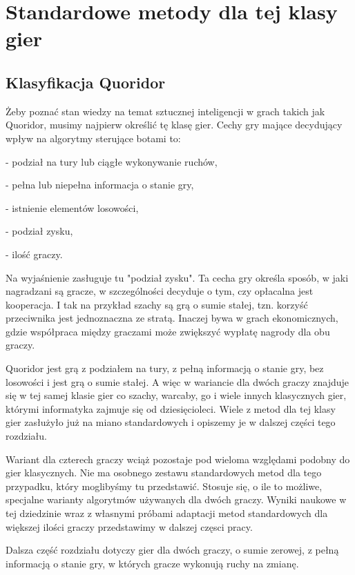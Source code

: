 \documentclass{pracamgr}
\begin{document}
\chapter{Standardowe metody dla tej klasy gier}

\section{Klasyfikacja Quoridor}

Żeby poznać stan wiedzy na temat sztucznej inteligencji w grach takich jak Quoridor, musimy najpierw określić tę klasę gier.
Cechy gry mające decydujący wpływ na algorytmy sterujące botami to:

 - podział na tury lub ciągłe wykonywanie ruchów,

 - pełna lub niepełna informacja o stanie gry,

 - istnienie elementów losowości,

 - podział zysku,

 - ilość graczy.

Na wyjaśnienie zasługuje tu "podział zysku". Ta cecha gry określa sposób, w jaki nagradzani są gracze, w szczególności decyduje o tym, czy opłacalna jest kooperacja. I tak na przykład szachy są grą o sumie stałej, tzn. korzyść przeciwnika jest jednoznaczna ze stratą. Inaczej bywa w grach ekonomicznych, gdzie współpraca między graczami może zwiększyć wypłatę nagrody dla obu graczy.

Quoridor jest grą z podziałem na tury, z pełną informacją o stanie gry, bez losowości i jest grą o sumie stałej. A więc w wariancie dla dwóch graczy znajduje się w tej samej klasie gier co szachy, warcaby, go i wiele innych klasycznych gier, którymi informatyka zajmuje się od dziesięcioleci. Wiele z metod dla tej klasy gier zasłużyło już na miano standardowych i opiszemy je w dalszej części tego rozdziału.

Wariant dla czterech graczy wciąż pozostaje pod wieloma względami podobny do gier klasycznych. Nie ma osobnego zestawu standardowych metod dla tego przypadku, który moglibyśmy tu przedstawić. Stosuje się, o ile to możliwe, specjalne warianty algorytmów używanych dla dwóch graczy. Wyniki naukowe w tej dziedzinie wraz z własnymi próbami adaptacji metod standardowych dla większej ilości graczy przedstawimy w dalszej częsci pracy.

Dalsza część rozdziału dotyczy gier dla dwóch graczy, o sumie zerowej, z pełną informacją o stanie gry, w których gracze wykonują ruchy na zmianę.
\end{document}
